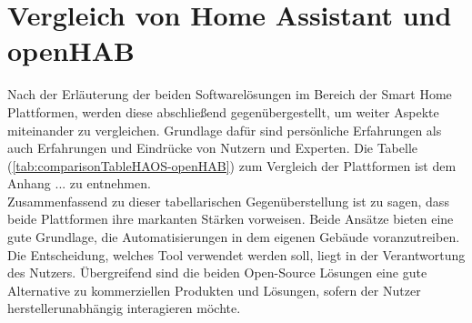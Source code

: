 \section{Vergleich von Home Assistant und openHAB}
\label{sec:comparison-HAOS-openHAB}
    Nach der Erläuterung der beiden Softwarelösungen im Bereich der Smart Home Plattformen, werden diese abschließend 
    gegenübergestellt, um weiter Aspekte miteinander zu vergleichen. Grundlage dafür sind persönliche Erfahrungen als auch 
    Erfahrungen und Eindrücke von Nutzern und Experten. Die Tabelle (\ref{tab:comparisonTableHAOS-openHAB}) zum Vergleich 
    der Plattformen ist dem Anhang ... zu entnehmen.
    \\
    Zusammenfassend zu dieser tabellarischen Gegenüberstellung ist zu sagen, dass beide Plattformen ihre markanten Stärken vorweisen. 
    Beide Ansätze bieten eine gute Grundlage, die Automatisierungen in dem eigenen Gebäude voranzutreiben. Die Entscheidung, welches 
    Tool verwendet werden soll, liegt in der Verantwortung des Nutzers. Übergreifend sind die beiden Open-Source Lösungen eine gute 
    Alternative zu kommerziellen Produkten und Lösungen, sofern der Nutzer herstellerunabhängig interagieren möchte.
